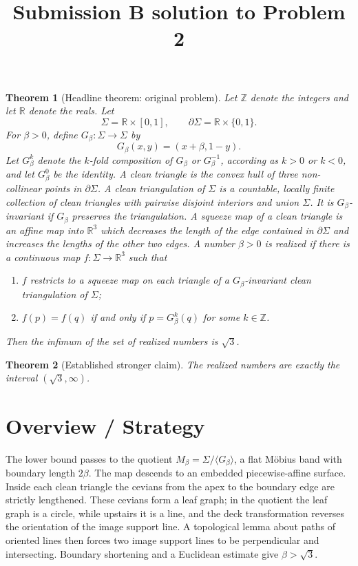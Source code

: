 \documentclass[12pt]{article}
\newcommand{\R}{\mathbb R}
\newcommand{\Z}{\mathbb Z}
\theoremstyle{plain}
\newtheorem{theorem}{Theorem}
\begin{document}
\title{Submission B solution to Problem 2}
\date{}
\maketitle

\begin{theorem}[Headline theorem: original problem]\label{thm:headline}
\normalfont
Let \(\Z\) denote the integers and let \(\R\) denote the reals.  Let
\[
\Sigma=\R\times[0,1],\qquad \partial\Sigma=\R\times\{0,1\}.
\]
For \(\beta>0\), define \(G_\beta:\Sigma\to\Sigma\) by
\[
G_\beta(x,y)=(x+\beta,1-y).
\]
Let \(G_\beta^k\) denote the \(k\)-fold composition of \(G_\beta\) or
\(G_\beta^{-1}\), according as \(k>0\) or \(k<0\), and let
\(G_\beta^0\) be the identity.  A \emph{clean triangle} is the convex hull of
three non-collinear points in \(\partial\Sigma\).  A \emph{clean triangulation}
of \(\Sigma\) is a countable, locally finite collection of clean triangles
with pairwise disjoint interiors and union \(\Sigma\).  It is
\(G_\beta\)-\emph{invariant} if \(G_\beta\) preserves the triangulation.  A
\emph{squeeze map} of a clean triangle is an affine map into \(\R^3\) which
decreases the length of the edge contained in \(\partial\Sigma\) and increases
the lengths of the other two edges.  A number \(\beta>0\) is \emph{realized}
if there is a continuous map \(f:\Sigma\to\R^3\) such that
\begin{enumerate}
\item \(f\) restricts to a squeeze map on each triangle of a
\(G_\beta\)-invariant clean triangulation of \(\Sigma\);
\item \(f(p)=f(q)\) if and only if \(p=G_\beta^k(q)\) for some \(k\in\Z\).
\end{enumerate}
Then the infimum of the set of realized numbers is \(\sqrt3\).
\end{theorem}

\begin{theorem}[Established stronger claim]\label{thm:strong}
The realized numbers are exactly the interval \((\sqrt3,\infty)\).
\end{theorem}

\section*{Overview / Strategy}

The lower bound passes to the quotient
\(M_\beta=\Sigma/\langle G_\beta\rangle\), a flat M\"obius band with boundary
length \(2\beta\).  The map descends to an embedded piecewise-affine surface.
Inside each clean triangle the cevians from the apex to the boundary edge are
strictly lengthened.  These cevians form a leaf graph; in the quotient the leaf
graph is a circle, while upstairs it is a line, and the deck transformation
reverses the orientation of the image support line.  A topological lemma about
paths of oriented lines then forces two image support lines to be perpendicular
and intersecting.  Boundary shortening and a Euclidean estimate give
\(\beta>\sqrt3\).
\end{document}
